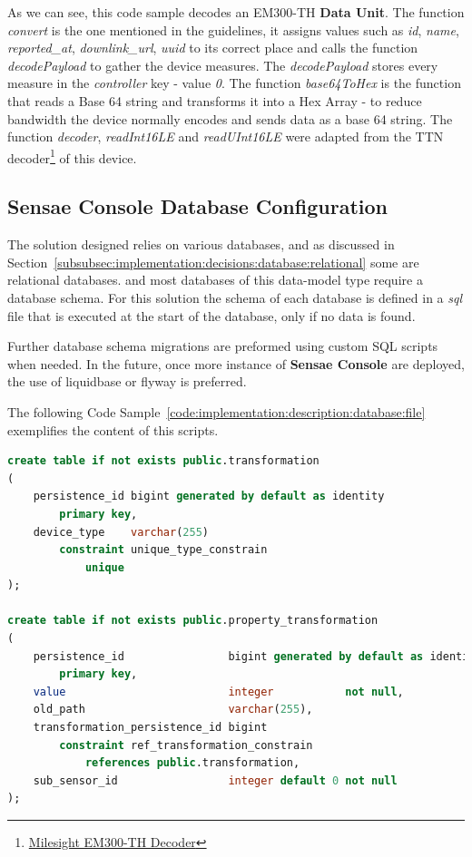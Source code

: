 As we can see, this code sample decodes an EM300-TH \textbf{Data Unit}. The function \textit{convert} is the one mentioned in the guidelines, it assigns values such as \textit{id}, \textit{name}, \textit{reported\_at}, \textit{downlink\_url}, \textit{uuid} to its correct place and calls the function \textit{decodePayload} to gather the device measures. The \textit{decodePayload} stores every measure in the \textit{controller} key - value \textit{0}. The function \textit{base64ToHex} is the function that reads a Base 64 string and transforms it into a Hex Array - to reduce bandwidth the device normally encodes and sends data as a base 64 string. The function \textit{decoder}, \textit{readInt16LE} and \textit{readUInt16LE} were adapted from the TTN decoder\footnote{\href {https://www.milesight-iot.com/lorawan/sensor/em300-th}{Milesight EM300-TH Decoder}} of this device.

\subsection{Sensae Console Database Configuration}
\label{subsec:implementation:description:database}

The solution designed relies on various databases, and as discussed in Section~\ref{subsubsec:implementation:decisions:database:relational} some are relational databases.  and most databases of this data-model type require a database schema. For this solution the schema of each database is defined in a \textit{sql} file that is executed at the start of the database, only if no data is found.

Further database schema migrations are preformed using custom \gls{SQL} scripts when needed. In the future, once more instance of \textbf{Sensae Console} are deployed, the use of liquidbase or flyway is preferred.

The following Code Sample~\ref{code:implementation:description:database:file} exemplifies the content of this scripts.

\begin{lstlisting}[language=SQL, caption=Initialization Script Segment for Data Processor Database, label={code:implementation:description:database:file}]
create table if not exists public.transformation
(
    persistence_id bigint generated by default as identity
        primary key,
    device_type    varchar(255)
        constraint unique_type_constrain
            unique
);

create table if not exists public.property_transformation
(
    persistence_id                bigint generated by default as identity (maxvalue 2147483647)
        primary key,
    value                         integer           not null,
    old_path                      varchar(255),
    transformation_persistence_id bigint
        constraint ref_transformation_constrain
            references public.transformation,
    sub_sensor_id                 integer default 0 not null
);
\end{lstlisting}

